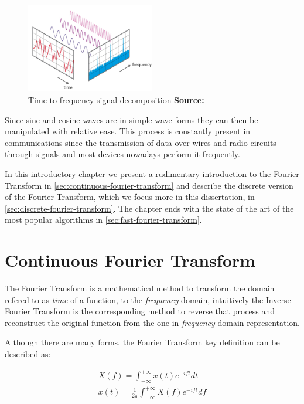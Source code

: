 \documentclass[
  oneside,
  11pt, a4paper,
  footinclude=true,
  headinclude=true,
  cleardoublepage=empty
]{scrbook}
\newcommand{\eqname}[1]{\tag*{#1}}%
\newcommand*{\source}[1]{%
    \textbf{Source:} \cite{#1}%
}
\begin{document}
\begin{figure}[h] 
    \centering
    \includegraphics[width=0.5\textwidth]{img/fft_time_freq.png}
    \caption{Time to frequency signal decomposition \source{fftntiaudio}}
    \label{fig:signal-decomposition}
\end{figure}

Since sine and cosine waves are in simple wave forms they can then be manipulated with relative ease. This process is constantly present in communications since the transmission of data over wires and radio circuits through signals and most devices nowadays perform it frequently.
\newline

In this introductory chapter we present a rudimentary introduction to the Fourier Transform in \autoref{sec:continuous-fourier-transform} and describe the discrete version of the Fourier Transform, which we focus more in this dissertation, in \autoref{sec:discrete-fourier-transform}. The chapter ends with the state of the art of the most popular algorithms in \autoref{sec:fast-fourier-transform}.



\section{Continuous Fourier Transform} \label{sec:continuous-fourier-transform}

The Fourier Transform is a mathematical method to transform the domain refered to as \textit{time} of a function, to the \textit{frequency} domain, intuitively the Inverse Fourier Transform is the corresponding method to reverse that process and reconstruct the original function from the one in \textit{frequency} domain representation.

Although there are many forms, the Fourier Transform key definition can be described as:

\begin{equation} \label{eq:fourier-transform}
    \begin{split}
        X(f) = \int_{-\infty}^{+\infty} x(t)e^{-i f t} dt \\
        x(t) = \frac{1}{2\pi} \int_{-\infty}^{+\infty} X(f)e^{-i f t} df \\
    \end{split} %
\end{equation}
\end{document}
